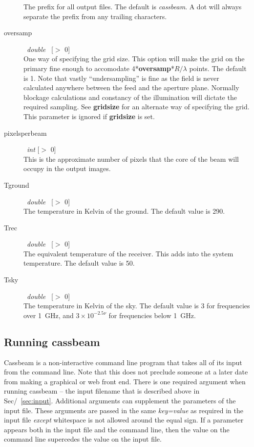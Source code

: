\documentclass{article}
\begin{document}
\begin{description}
The prefix for all output files.  The default is {\it cassbeam}.  A dot
will always separate the prefix from any trailing characters.
\item[oversamp] \ {\it double} \ [$>$ 0] \\
One way of specifying the grid size.  This option will make the grid on the
primary fine enough to accomodate 4*{\bf oversamp}*$R/\lambda$ points.  The
default is 1.  Note that vastly ``undersampling'' is fine as the field is
never calculated anywhere between the feed and the aperture plane.  Normally
blockage calculations and constancy of the illumination will dictate the
required sampling.  See {\bf gridsize} for an alternate way of specifying
the grid.  This parameter is ignored if {\bf gridsize} is set.
\item[pixelsperbeam] \ {\it int} [$>$ 0] \\
This is the approximate number of pixels that the core of the beam will
occupy in the output images.
\item[Tground] \ {\it double} \ [$>$ 0] \\
The temperature in Kelvin of the ground.  The default value is 290.
\item[Trec] \ {\it double} \ [$>$ 0] \\
The equivalent temperature of the receiver.  This adds into the system
temperature.  The default value is 50.
\item[Tsky] \ {\it double} \ [$>$ 0] \\
The temperature in Kelvin of the sky.  The default value is 3 for frequencies
over 1~GHz, and $3 \times 10^{-2.5 \nu}$ for frequencies below 1~GHz.
\end{description}

\subsection{Running cassbeam}

Cassbeam is a non-interactive command line program that takes all of its input
from the command line.  Note that this does not preclude someone at a later
date from making a graphical or web front end.  There is one required
argument when running cassbeam -- the input filename that is described
above in Sec/~\ref{sec:input}.  Additional arguments can supplement the
parameters of the input file.  These arguments are passed in the 
same {\it key=value} as required in the input file {\it except} whitespace
is not allowed around the equal sign.  If a parameter appears both
in the input file and the command line, then the value on the command line
supercedes the value on the input file.
\end{document}
